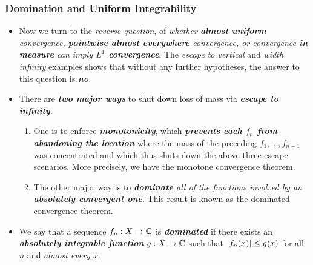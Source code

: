 \documentclass[11pt]{article}
\begin{document}
\subsubsection{Domination and Uniform Integrability}
\begin{itemize}
\item \begin{remark}
Now we turn to the \emph{reverse question}, of \emph{whether \textbf{almost uniform} convergence, \textbf{pointwise almost everywhere} convergence, or convergence \textbf{in measure} can imply \textbf{$L^1$ convergence}}. The \emph{escape to vertical} and \emph{width infinity} examples shows that without any further hypotheses, the answer to this question is \emph{\textbf{no}}. 
\end{remark}


\item \begin{remark} \citep{tao2011introduction} 
There are \emph{\textbf{two major ways}} to shut down loss of mass via \emph{\textbf{escape to infinity}}.
\begin{enumerate}
\item One is to enforce \emph{\textbf{monotonicity}}, which \emph{\textbf{prevents each $f_n$ from abandoning the location}} where the
mass of the preceding $f_1, \ldots , f_{n-1}$ was concentrated and which thus shuts down the above three escape scenarios. More precisely, we have the monotone convergence theorem.

\item The other major way is to \emph{\textbf{dominate} all of the functions involved by an \textbf{absolutely convergent one}}. This result is known as the dominated convergence theorem. 
\end{enumerate} 
\end{remark}

\item \begin{definition}
We say that a sequence $f_n : X \rightarrow {\mathbb C}$ is \emph{\textbf{dominated}} if there exists an \emph{\textbf{absolutely integrable function}} $g : X \rightarrow {\mathbb C}$ such that $\left\lvert f_n(x) \right\rvert \le g(x)$ for all $n$ and \emph{almost every $x$}. 
\end{definition}


\end{itemize}
\end{document}
